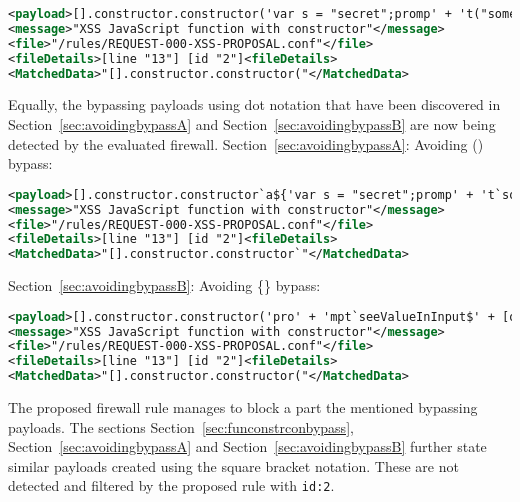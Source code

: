 \begin{lstlisting}[style=ruleStyle, language=XML, caption=function constructor bypass payload using dot notation blocked, label={lst:constructorsblockedpoc}]
<payload>[].constructor.constructor('var s = "secret";promp' + 't("something", s)')()</payload>
<message>"XSS JavaScript function with constructor"</message>
<file>"/rules/REQUEST-000-XSS-PROPOSAL.conf"</file>
<fileDetails>[line "13"] [id "2"]<fileDetails>
<MatchedData>"[].constructor.constructor("</MatchedData>
\end{lstlisting}

Equally, the bypassing payloads using dot notation that have been discovered in Section~\ref{sec:avoidingbypassA} and  Section~\ref{sec:avoidingbypassB} are now being detected by the evaluated firewall. Section~\ref{sec:avoidingbypassA}: Avoiding () bypass:

\begin{lstlisting}[style=ruleStyle, language=XML, caption=avoiding () bypass payload using dot notation blocked, label={lst:constructorsblockedpoc}]
<payload>[].constructor.constructor`a${'var s = "secret";promp' + 't`something\u{0024}{s}`'}```</payload>
<message>"XSS JavaScript function with constructor"</message>
<file>"/rules/REQUEST-000-XSS-PROPOSAL.conf"</file>
<fileDetails>[line "13"] [id "2"]<fileDetails>
<MatchedData>"[].constructor.constructor`"</MatchedData>
\end{lstlisting}

Section~\ref{sec:avoidingbypassB}: Avoiding \{\} bypass:

\begin{lstlisting}[style=ruleStyle, language=XML, caption=avoiding \{\} bypass payload using dot notation blocked, label={lst:constructorsblockedpoc}]
<payload>[].constructor.constructor('pro' + 'mpt`seeValueInInput$' + [open + []][0][16] + '2+2' + [open + []][0][36] + ':`')();</payload>
<message>"XSS JavaScript function with constructor"</message>
<file>"/rules/REQUEST-000-XSS-PROPOSAL.conf"</file>
<fileDetails>[line "13"] [id "2"]<fileDetails>
<MatchedData>"[].constructor.constructor("</MatchedData>
\end{lstlisting}

The proposed firewall rule manages to block a part the mentioned bypassing payloads. The sections Section~\ref{sec:funconstrconbypass}, Section~\ref{sec:avoidingbypassA} and Section~\ref{sec:avoidingbypassB} further state similar payloads created using the square bracket notation. These are not detected and filtered by the proposed rule with \verb|id:2|.

